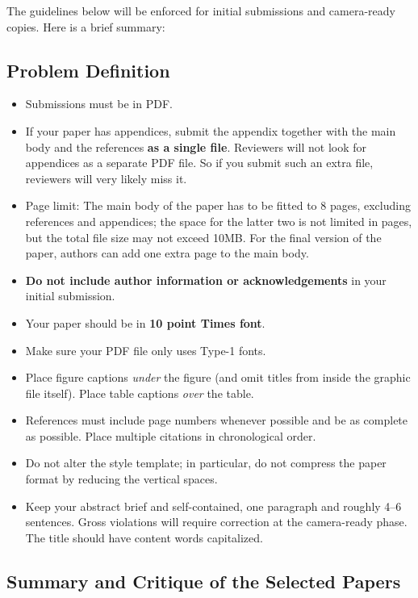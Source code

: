 \documentclass{article}
\theoremstyle{plain}
\theoremstyle{definition}
\theoremstyle{remark}
\begin{document}
The guidelines below will be enforced for initial submissions and
camera-ready copies. Here is a brief summary:


\subsection{Problem Definition}

\begin{itemize}
\item Submissions must be in PDF\@. 
\item If your paper has appendices, submit the appendix together with the main body and the references \textbf{as a single file}. Reviewers will not look for appendices as a separate PDF file. So if you submit such an extra file, reviewers will very likely miss it.
\item Page limit: The main body of the paper has to be fitted to 8 pages, excluding references and appendices; the space for the latter two is not limited in pages, but the total file size may not exceed 10MB. For the final version of the paper, authors can add one extra page to the main body.
\item \textbf{Do not include author information or acknowledgements} in your
    initial submission.
\item Your paper should be in \textbf{10 point Times font}.
\item Make sure your PDF file only uses Type-1 fonts.
\item Place figure captions \emph{under} the figure (and omit titles from inside
    the graphic file itself). Place table captions \emph{over} the table.
\item References must include page numbers whenever possible and be as complete
    as possible. Place multiple citations in chronological order.
\item Do not alter the style template; in particular, do not compress the paper
    format by reducing the vertical spaces.
\item Keep your abstract brief and self-contained, one paragraph and roughly
    4--6 sentences. Gross violations will require correction at the
    camera-ready phase. The title should have content words capitalized.
\end{itemize}

\subsection{Summary and Critique of the Selected Papers}
\end{document}
